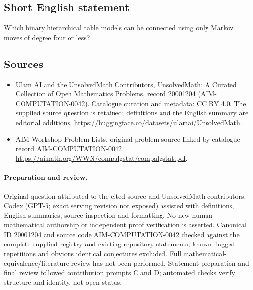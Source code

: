 \documentclass[11pt]{article}
\begin{document}
\subsection{Short English statement}
Which binary hierarchical table models can be connected using only Markov moves of degree four or less?
\subsection{Sources}
\begin{itemize}
\item[\hypertarget{source:20001204:1}{S1}] Ulam AI and the UnsolvedMath Contributors, UnsolvedMath: A Curated Collection of Open Mathematics Problems, record 20001204 (AIM-COMPUTATION-0042). Catalogue curation and metadata: CC BY 4.0. The supplied source question is retained; definitions and the English summary are editorial additions.
\url{https://huggingface.co/datasets/ulamai/UnsolvedMath}.
\item[\hypertarget{source:20001204:2}{S2}] AIM Workshop Problem Lists, original problem source linked by catalogue record AIM-COMPUTATION-0042
\url{https://aimath.org/WWN/compalgstat/compalgstat.pdf}.
\end{itemize}
\paragraph{Preparation and review.}
Original question attributed to the cited source and UnsolvedMath contributors. Codex (GPT-6; exact serving revision not exposed) assisted with definitions, English summaries, source inspection and formatting. No new human mathematical authorship or independent proof verification is asserted. Canonical ID 20001204 and source code AIM-COMPUTATION-0042 checked against the complete supplied registry and existing repository statements; known flagged repetitions and obvious identical conjectures excluded. Full mathematical-equivalence/literature review has not been performed. Statement preparation and final review followed contribution prompts C and D; automated checks verify structure and identity, not open status.
\label{end:20001204}
\end{document}
